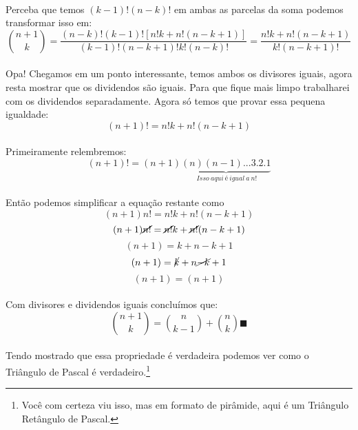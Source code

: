 \documentclass[a4paper,11pt,oneside]{book}
\theoremstyle{definition}
\theoremstyle{break}
\begin{document}
\\
Perceba que temos $(k-1)!(n-k)!$ em ambas as parcelas da soma podemos transformar isso em:
\\
$${n+1 \choose k} = \frac{(n-k)!(k-1)![n!k+n!(n-k+1)]}{(k-1)!(n-k+1)!k!(n-k)!} = \frac{n!k + n!(n-k+1)}{k!(n-k+1)!}$$
\\
Opa! Chegamos em um ponto interessante, temos ambos os divisores iguais, agora resta mostrar que os dividendos são iguais. Para que fique mais limpo trabalharei com os dividendos separadamente. Agora só temos que provar essa pequena igualdade:
\\
$$ (n + 1)! = n!k + n!(n - k + 1) $$
\\
Primeiramente relembremos:
\\
$$ (n+1)! = (n+1)\underbrace{(n)(n-1)...3.2.1}_{ \ Isso \ aqui \ é \ igual \ a \ n!} $$
\\
Então podemos simplificar a equação restante como
\\
$$ (n+1)n! = n!k + n!(n-k+1) $$
$$ (n+1)\cancel{n!} = \cancel{n!}k + \cancel{n!}(n-k+1) $$
$$ (n+1) = k + n - k + 1 $$
$$ (n+1) = \cancel{k} + n\cancel{-k}+1 $$
$$ (n+1) = (n+1) $$
\\
Com divisores e dividendos iguais concluímos que:
$$ {n+1 \choose k} = {n \choose k-1} + {n \choose k} \blacksquare$$
\\
Tendo mostrado que essa propriedade é verdadeira podemos ver como o Triângulo de Pascal é verdadeiro.\footnote{Você com certeza viu isso, mas em formato de pirâmide, aqui é um Triângulo Retângulo de Pascal.}
\\
\end{document}
